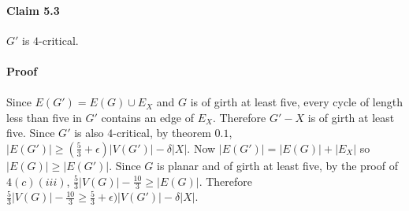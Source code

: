 \documentclass[letterpaper,12pt,oneside,onecolumn]{report}
\begin{document}
\paragraph{Claim 5.3}
$G'$ is $4$-critical.
\paragraph{Proof}

\paragraph{}
Since $E(G') = E(G) \cup E_X$ and $G$ is of girth at least five, every cycle of length less than five in $G'$ contains an edge of $E_X$. Therefore $G' - X$ is of girth at least five. Since $G'$ is also $4$-critical, by theorem $0.1$, $|E(G')| \geq (\frac{5}{3} + \epsilon)|V(G')| - \delta|X|$. Now $|E(G')|  = |E(G)| + |E_X|$ so $|E(G)| \geq |E(G')|$. Since $G$ is planar and of girth at least five, by the proof of $4(c)(iii)$, $\frac{5}{3}|V(G)| -\frac{10}{3} \geq |E(G)|$. Therefore $\frac{5}{3}|V(G)| -\frac{10}{3} \geq \frac{5}{3} + \epsilon)|V(G')| - \delta|X|$.
\end{document}
